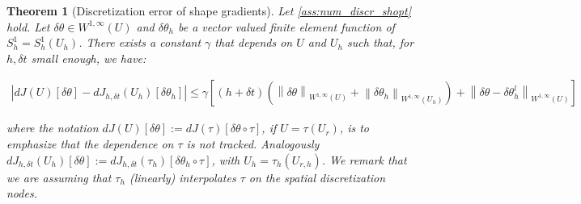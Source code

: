 \documentclass[english,a4paper,10pt,oneside]{scrbook}	%
\theoremstyle{break}
\newtheorem{thm}[equation]{Theorem}
\theoremstyle{remark}
\newcommand{\norm}[1]{\left\lVert#1\right\rVert}
\newcommand{\te}{\theta}
\begin{document}
\begin{thm}[Discretization error of shape gradients]

Let \ref{ass:num_discr_shopt} hold. Let $\delta \te \in W^{1,\infty}(U)$ and $\delta \te_h$ be a vector valued finite element function of $S^1_h=S^1_h(U_h)$. There exists a constant $\gamma$ that depends on $U$ and $U_h$ such that, for $h,\delta t$ small enough, we have:

\begin{align*}
|dJ(	U)[\delta \te]-dJ_{h,\delta t}(U_h)[\delta \te_h]|\leq \gamma\left [ (h+\delta t)(\norm{\delta \te}_{W^{1,\infty}(U)}+\norm{\delta \te_h}_{W^{1,\infty}(U_h)}) + \norm{\delta \te - \delta \te_h^l}_{W^{1,\infty}(U)}\right ]
\end{align*}

where the notation $dJ(U)[\delta \te]:=dJ(\tau)[\delta \te\circ \tau]$, if $U=\tau(U_r)$, is to emphasize that the dependence on $\tau$ is not tracked.
Analogously $dJ_{h,\delta t}(U_h)[\delta \te]:=dJ_{h,\delta t}(\tau_h)[\delta \te_h\circ \tau]$, with $U_h = \tau_h(U_{r,h})$. We remark that we are assuming that $\tau_h$ (linearly) interpolates $\tau$ on the spatial discretization nodes.

\end{thm}
\end{document}
